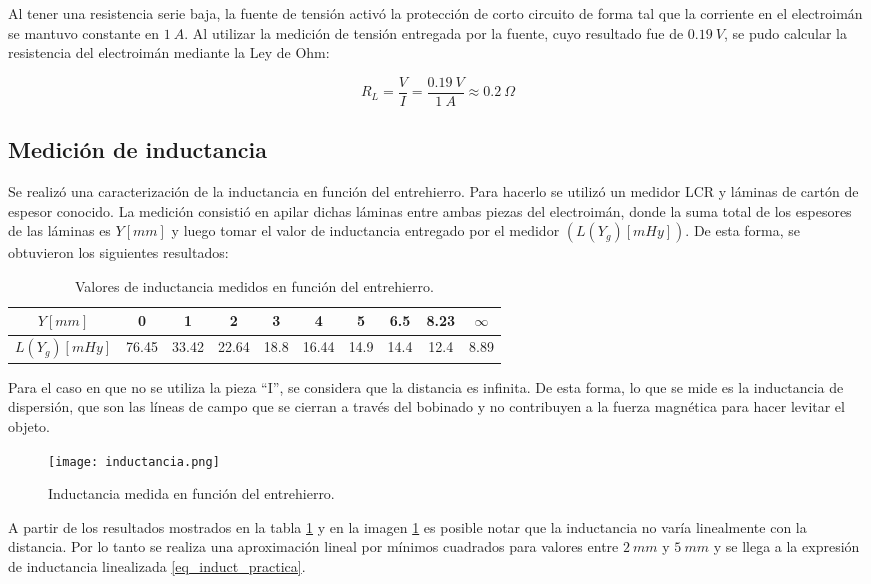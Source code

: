 \noindent Al tener una resistencia serie baja, la fuente de tensión activó la protección de corto circuito de forma tal que la corriente en el electroimán se mantuvo constante en $1\:A$. Al utilizar la medición de tensión entregada por la fuente, cuyo resultado fue de $0.19\:V$, se pudo calcular la resistencia del electroimán mediante la Ley de Ohm:

\begin{equation}
	R_{L}=\frac{V}{I}=\frac{0.19\:V}{1\:A}	\approx0.2\:\Omega
\end{equation}

\subsection{Medición de inductancia}

\noindent Se realizó una caracterización de la inductancia en función del entrehierro. Para hacerlo se utilizó un medidor LCR y láminas de cartón de espesor conocido. La medición consistió en apilar dichas láminas entre ambas piezas del electroimán, donde la suma total de los espesores de las láminas es $Y[mm]$ y luego tomar el valor de inductancia entregado por el medidor $(L(Y_{g})[mHy])$. De esta forma, se obtuvieron los siguientes resultados:

\begin{table} [H]
	\begin{center}
		\begin{tabular}{| c | c | c | c | c | c | c | c | c | c |}
			\hline			
			$Y[mm]$ & 0 & 1 & 2 & 3 & 4 & 5 & 6.5 & 8.23 & $\infty$ \\ \hline
			$L(Y_{g})[mHy]$ & 76.45 & 33.42 & 22.64 & 18.8 & 16.44 & 14.9 & 14.4 & 12.4 & 8.89\\ \hline
		\end{tabular}
		\caption{Valores de inductancia medidos en función del entrehierro.}
		\label{tab_mediciones_inductancia}
	\end{center}
\end{table}

\noindent Para el caso en que no se utiliza la pieza ``I'', se considera que la distancia es infinita. De esta forma, lo que se mide es la inductancia de dispersión, que son las líneas de campo que se cierran a través del bobinado y no contribuyen a la fuerza magnética para hacer levitar el objeto.



\begin{figure} [H]
	\centering
	\texttt{[image: inductancia.png]}
	\caption{Inductancia medida en función del entrehierro.}
	\label{fig:img_inductancia_medida}
\end{figure}
\noindent A partir de los resultados mostrados en la tabla \ref{tab_mediciones_inductancia} y en la imagen \ref{fig:img_inductancia_medida} es posible notar que la inductancia no varía linealmente con la distancia. Por lo tanto se realiza una aproximación lineal por mínimos cuadrados para valores entre $2\:mm$ y $5\:mm$ y se llega a la expresión de inductancia linealizada 	\ref{eq_induct_practica}.

